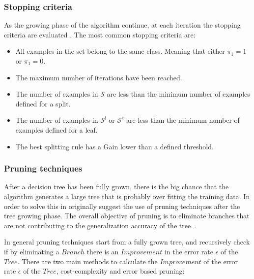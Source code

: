  
\subsubsection{Stopping criteria}
As the growing phase of the algorithm continue, at each iteration the stopping criteria are 
evaluated \citep{Rokach2010}. The most common stopping criteria are:
 \begin{itemize}
   \item All examples in the set belong to the same class. Meaning that either $\pi_1=1$ or 
    $\pi_1=0$.

  \item The maximum number of iterations have been reached.
  
  \item The number of examples in $\mathcal{S}$ are less than the minimum number of examples 
defined for a split.
  
  \item The number of examples in $\mathcal{S}^l$ or $\mathcal{S}^r$ are less than the minimum 
number of examples defined for a leaf.
  
  \item The best splitting rule has a Gain lower than a defined threshold.
\end{itemize}


\subsubsection{Pruning techniques}
After a decision tree has been fully grown, there is the big chance that  the algorithm generates a 
large tree that is probably over fitting the  training data. In order to solve this in 
\citep{Breiman1984a} originally suggest the use of pruning techniques after the tree growing phase.
The overall objective of pruning is to eliminate branches that are not contributing
to the generalization accuracy of the \mbox{tree \citep{Rokach2010}.}
 
In general pruning techniques start from a fully grown tree, and recursively check if by eliminating 
a $Branch$ there is an $Improvement$ in the error rate $\epsilon$ of the $Tree$.  There are two main 
methods to calculate the $Improvement$ of the error rate $\epsilon$ of the $Tree$, cost-complexity 
and  error based pruning:
  
